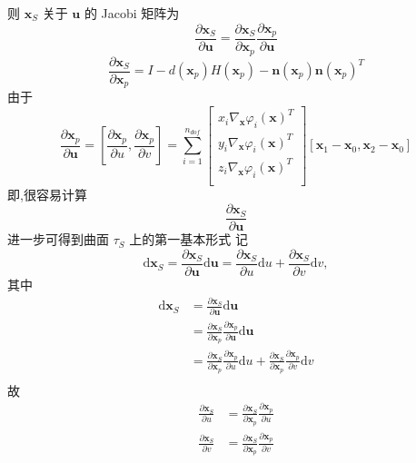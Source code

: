 \documentclass{article}
\begin{document}
则 $\mathbf x_S$ 关于 $\mathbf u$ 的 Jacobi 矩阵为
\begin{equation*}
\frac{\partial \mathbf x_S}{\partial\mathbf u} = \frac{\partial \mathbf x_S}{\partial\mathbf x_p}\frac{\partial \mathbf x_p}{\partial\mathbf u}
\end{equation*}
\begin{equation*}
\frac{\partial \mathbf x_S}{\partial\mathbf x_p} = I - d(\mathbf x_p) H(\mathbf x_p) - \mathbf n(\mathbf x_p)\mathbf n(\mathbf x_p)^T
\end{equation*}
由于
\begin{equation*}
\frac{\partial \mathbf x_p}{\partial \mathbf u}=[\frac{\partial \mathbf x_p}{\partial u}, \frac{\partial \mathbf x_p}{\partial v}]=\sum_{i=1}^{n_{dof}}
\begin{bmatrix}
x_i\nabla_{\mathbf x}\varphi_i(\mathbf x)^T\\
y_i\nabla_{\mathbf x}\varphi_i(\mathbf x)^T\\
z_i\nabla_{\mathbf x}\varphi_i(\mathbf x)^T\\
\end{bmatrix}
[\mathbf x_1 - \mathbf x_0, \mathbf x_2 - \mathbf x_0]
\end{equation*}
即,很容易计算
\begin{equation*}
\frac{\partial \mathbf x_S}{\partial\mathbf u}
\end{equation*}
进一步可得到曲面 $\tau_S$ 上的第一基本形式
记
\begin{equation*} 
\mathrm d \mathbf x_S = \frac{\partial \mathbf x_S}{\partial \mathbf u}\mathrm d \mathbf u = \frac{\partial \mathbf x_S}{\partial u}\mathrm d u + \frac{\partial \mathbf x_S}{\partial v}\mathrm d v,
\end{equation*}
其中
\begin{equation*}
\begin{aligned}
\mathrm d \mathbf x_S & = \frac{\partial \mathbf x_S}{\partial \mathbf u}\mathrm d \mathbf u \\
& =\frac{\partial \mathbf x_S}{\partial\mathbf x_p}\frac{\partial \mathbf x_p}{\partial\mathbf u}\mathrm d \mathbf u \\
& = \frac{\partial \mathbf x_S}{\partial\mathbf x_p}\frac{\partial \mathbf x_p}{\partial u}\mathrm d u + \frac{\partial \mathbf x_S}{\partial\mathbf x_p}\frac{\partial \mathbf x_p}{\partial v}\mathrm d v\\
\end{aligned}
\end{equation*}
故
\begin{equation*}
\begin{aligned}
\frac{\partial \mathbf x_S}{\partial u} &= \frac{\partial \mathbf x_S}{\partial\mathbf x_p}\frac{\partial \mathbf x_p}{\partial u}\\
\frac{\partial \mathbf x_S}{\partial v} &= \frac{\partial \mathbf x_S}{\partial\mathbf x_p}\frac{\partial \mathbf x_p}{\partial v}
\end{aligned}
\end{equation*}
\end{document}

